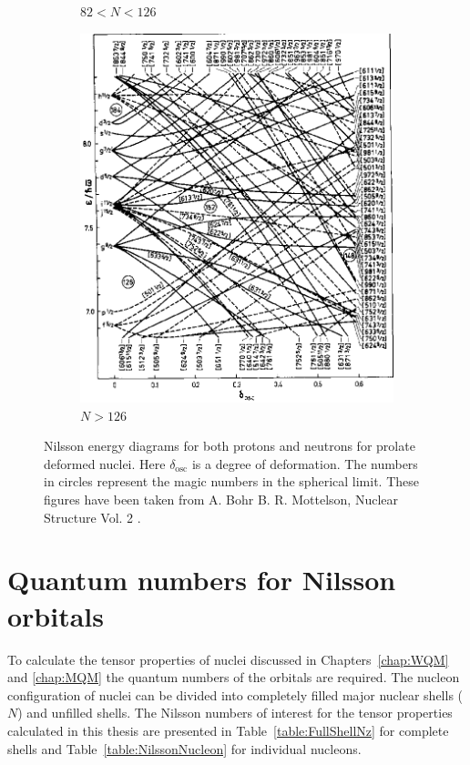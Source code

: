 \documentclass[10pt,a4paper, twoside, openright]{report}
\begin{document}
\begin{figure}
\begin{subfigure}[b]{0.48\textwidth}
    \caption{$82<N<126$}
\end{subfigure}	
\quad
\begin{subfigure}[b]{0.48\textwidth}
    \includegraphics[width=\textwidth]{./figures/Nilsson/neutron_deformed126.png}
    \caption{$N>126$}
\end{subfigure}
\caption{Nilsson energy diagrams for both protons and neutrons for prolate deformed nuclei. Here $\delta_{\text{osc}}$ is a degree of deformation. The numbers in circles represent the magic numbers in the spherical limit. These figures have been taken from A. Bohr B. R. Mottelson, Nuclear Structure Vol. 2 \cite{BohrMottVol2}. \label{fig:NilssonPlots}}

\end{figure}
\section{Quantum numbers for Nilsson orbitals}
To calculate the tensor properties of nuclei discussed in Chapters~\ref{chap:WQM} and \ref{chap:MQM} the quantum numbers of the orbitals are required. The nucleon configuration of nuclei can be divided into completely filled major nuclear shells ($N$) and unfilled shells. The Nilsson numbers of interest for the tensor properties calculated in this thesis are presented in Table~\ref{table:FullShellNz} for complete shells and Table~\ref{table:NilssonNucleon} for individual nucleons.
\end{document}
